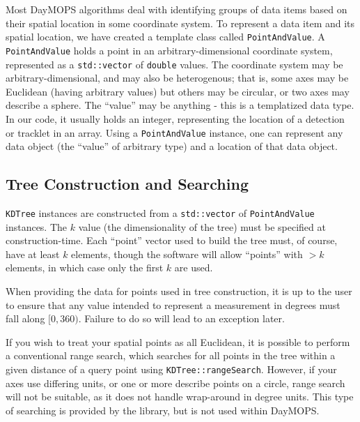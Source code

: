 Most DayMOPS algorithms deal with identifying groups of data items
based on their spatial location in some coordinate system.  To
represent a data item and its spatial location, we have created a
template class called {\tt PointAndValue}.  A {\tt PointAndValue}
holds a point in an arbitrary-dimensional coordinate system,
represented as a {\tt std::vector} of {\tt double} values.  The
coordinate system may be arbitrary-dimensional, and may also be
heterogenous; that is, some axes may be Euclidean (having arbitrary
values) but others may be circular, or two axes may describe a sphere.
The ``value'' may be anything - this is a templatized data type.  In
our code, it usually holds an integer, representing the location of a
detection or tracklet in an array.  Using a {\tt PointAndValue}
instance, one can represent any data object (the ``value'' of
arbitrary type) and a location of that data object.

\subsection{Tree Construction and Searching}

{\tt KDTree} instances are constructed from a {\tt std::vector} of
{\tt PointAndValue} instances.  The $k$ value (the dimensionality of
the tree) must be specified at construction-time.  Each ``point''
vector used to build the tree must, of course, have at least $k$
elements, though the software will allow ``points'' with $>k$
elements, in which case only the first $k$ are used.  

When providing the data for points used in tree construction, it is up
to the user to ensure that any value intended to represent a
measurement in degrees must fall along $[0,360)$.  Failure to do so
will lead to an exception later.

If you wish to treat your spatial points as all Euclidean, it is
possible to perform a conventional range search, which searches for
all points in the tree within a given distance of a query point using
{\tt KDTree::rangeSearch}.  However, if your axes use differing units,
or one or more describe points on a circle, range search will not be
suitable, as it does not handle wrap-around in degree units.  This
type of searching is provided by the library, but is not used within
DayMOPS.

